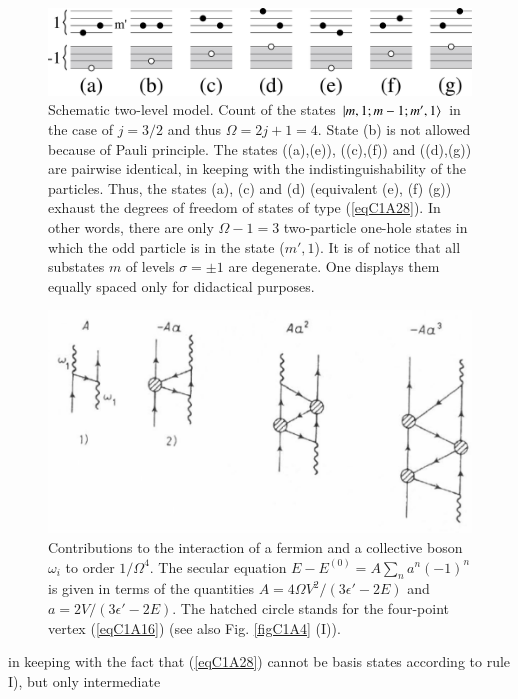   \begin{figure}
 	\centerline {
 		\includegraphics*[width=13cm]{introduccion/figs/figalpha}
 	}
 	\caption{Schematic two-level model. Count of the states $|{m,1;m-1;m',1} \rangle$ in the case of $j=3/2$ and thus $\Omega=2j+1=4$. State (b) is not allowed because of Pauli principle. The states ((a),(e)), ((c),(f)) and ((d),(g)) are pairwise identical, in keeping with the indistinguishability of the particles. Thus, the states (a), (c) and (d) (equivalent (e), (f) (g)) exhaust the degrees of freedom of states of type (\ref{eqC1A28}). In other words, there are only $\Omega-1=3$ two-particle one-hole states in which the odd particle is in the state ($m',1$). It is of notice that all substates $m$ of levels $\sigma=\pm1$ are degenerate. One displays them equally spaced only for didactical purposes.}
 	\label{figalpha}
 \end{figure}
  \begin{figure}
  \centerline {
  \includegraphics*[width=12cm]{introduccion/figs/fig19}
  }
  \caption{Contributions to the interaction of a fermion and a collective boson $\omega_i$ to order $1/\Omega^4$. The secular equation $E-E^{(0)}=A\sum_na^n(-1)^n$ is given in terms of the quantities $A=4\Omega V^2/(3\epsilon'-2E)$ and $a=2V/(3\epsilon'-2E)$. The hatched circle stands for the four-point vertex (\ref{eqC1A16}) (see also Fig. \ref{figC1A4} (I)).}
  \label{figC1A2}
  \end{figure}
in keeping with the fact that (\ref{eqC1A28}) cannot be basis states according to rule I), but only intermediate
